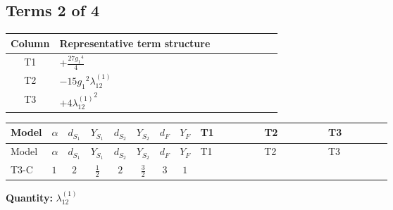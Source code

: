 \documentclass[8pt]{article}
\begin{document}
\begin{landscape}
\subsection*{Terms 2 of 4}
\begin{center}
\begin{tabular}{@{}c >{\raggedright\arraybackslash}p{0.82\linewidth}@{}}
\toprule
Column & Representative term structure \\
\midrule
T1 & \(\displaystyle +\frac{27 {g_1}^4}{4}\) \\
\midrule
T2 & \(\displaystyle -15 {g_1}^2 {\lambda_{12}^{(1)}}\) \\
\midrule
T3 & \(\displaystyle +4 {\lambda_{12}^{(1)}}^2\) \\
\midrule
\bottomrule
\end{tabular}
\end{center}
\smallskip
\tiny
\begin{longtable}{@{}llcccccc >{\raggedright\arraybackslash}p{0.21\linewidth} >{\raggedright\arraybackslash}p{0.21\linewidth} >{\raggedright\arraybackslash}p{0.21\linewidth}@{}}
\toprule
Model & $\alpha$ & $d_{S_1}$ & $Y_{S_1}$ & $d_{S_2}$ & $Y_{S_2}$ & $d_F$ & $Y_F$ & T1 & T2 & T3 \\
\midrule
\endfirsthead
\toprule
Model & $\alpha$ & $d_{S_1}$ & $Y_{S_1}$ & $d_{S_2}$ & $Y_{S_2}$ & $d_F$ & $Y_F$ & T1 & T2 & T3 \\
\midrule
\endhead
T3-C & $1$ & $2$ & $\frac{1}{2}$ & $2$ & $\frac{3}{2}$ & $3$ & $1$ & \scriptsize\adjustbox{max width=\linewidth}{$\begin{gathered} +\frac{27 {g_1}^4}{4}\end{gathered}$} & \scriptsize\adjustbox{max width=\linewidth}{$\begin{gathered} -15 {g_1}^2 {\lambda_{12}^{(1)}}\end{gathered}$} & \scriptsize\adjustbox{max width=\linewidth}{$\begin{gathered} +4 {\lambda_{12}^{(1)}}^2\end{gathered}$} \\
\midrule
\bottomrule
\end{longtable}
\clearpage
\noindent\textbf{Quantity: }$\lambda_{12}^{(1)}$\par\smallskip

\end{landscape}
\end{document}
